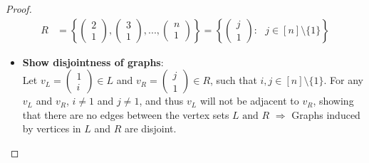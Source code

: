 \begin{proof}
\begin{align*}
        R &= \left\{ \begin{pmatrix} 2 \\ 1 \end{pmatrix}, \begin{pmatrix} 3 \\ 1 \end{pmatrix},..., \begin{pmatrix} n \\ 1 \end{pmatrix} \right\} = \left \{ \begin{pmatrix} j \\ 1 \end{pmatrix} : \text{ }j \in [n]\setminus\{1\}\right \}
    \end{align*}
    \begin{itemize}
        \item \textbf{Show disjointness of graphs}: \\
        Let \(v_L = \begin{pmatrix} 1 \\ i \end{pmatrix}\in L\) and \(v_R = \begin{pmatrix} j \\ 1 \end{pmatrix} \in R\), such that \(i, j \in [n]\setminus\{1\}\). For any \(v_L\) and \(v_R\), \(i \neq 1\) and \(j \neq 1\), and thus \(v_L\) will not be adjacent to \(v_R\), showing that there are no edges between the vertex sets \(L \text{ and } R\) $\Longrightarrow$ Graphs induced by vertices in $L$ and $R$ are disjoint.
        

\end{itemize}
\end{proof}
